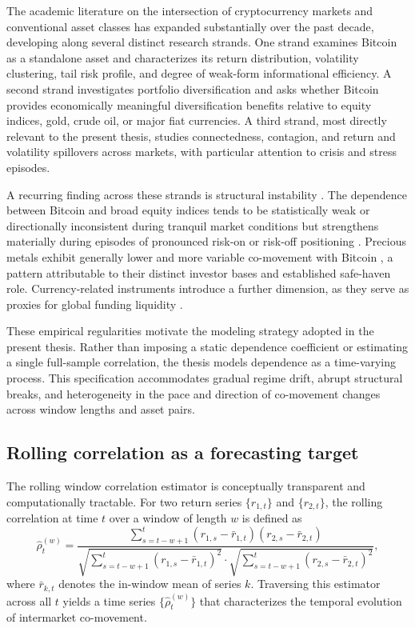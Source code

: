The academic literature on the intersection of cryptocurrency markets and conventional asset classes has expanded substantially over the past decade, developing along several distinct research strands. One strand examines Bitcoin as a standalone asset and characterizes its return distribution, volatility clustering, tail risk profile, and degree of weak-form informational efficiency. A second strand investigates portfolio diversification and asks whether Bitcoin provides economically meaningful diversification benefits relative to equity indices, gold, crude oil, or major fiat currencies. A third strand, most directly relevant to the present thesis, studies connectedness, contagion, and return and volatility spillovers across markets, with particular attention to crisis and stress episodes.

A recurring finding across these strands is structural instability \cite{bouri2017hedge, corbet2018exploring}. The dependence between Bitcoin and broad equity indices tends to be statistically weak or directionally inconsistent during tranquil market conditions but strengthens materially during episodes of pronounced risk-on or risk-off positioning \cite{ji2018network, kristoufek2015main}. Precious metals exhibit generally lower and more variable co-movement with Bitcoin \cite{dyhrberg2016bitcoin, klein2018bitcoin}, a pattern attributable to their distinct investor bases and established safe-haven role. Currency-related instruments introduce a further dimension, as they serve as proxies for global funding liquidity \cite{corbet2018exploring}.

These empirical regularities motivate the modeling strategy adopted in the present thesis. Rather than imposing a static dependence coefficient or estimating a single full-sample correlation, the thesis models dependence as a time-varying process. This specification accommodates gradual regime drift, abrupt structural breaks, and heterogeneity in the pace and direction of co-movement changes across window lengths and asset pairs.

\subsection{Rolling correlation as a forecasting target}

The rolling window correlation estimator is conceptually transparent and computationally tractable. For two return series $\{r_{1,t}\}$ and $\{r_{2,t}\}$, the rolling correlation at time $t$ over a window of length $w$ is defined as
\begin{equation}
    \hat{\rho}_{t}^{(w)} = \frac{\sum_{s=t-w+1}^{t}(r_{1,s} - \bar{r}_{1,t})(r_{2,s} - \bar{r}_{2,t})}
    {\sqrt{\sum_{s=t-w+1}^{t}(r_{1,s} - \bar{r}_{1,t})^{2}} \cdot
     \sqrt{\sum_{s=t-w+1}^{t}(r_{2,s} - \bar{r}_{2,t})^{2}}},
\end{equation}
where $\bar{r}_{k,t}$ denotes the in-window mean of series $k$. Traversing this estimator across all $t$ yields a time series $\{\hat{\rho}_{t}^{(w)}\}$ that characterizes the temporal evolution of intermarket co-movement.


